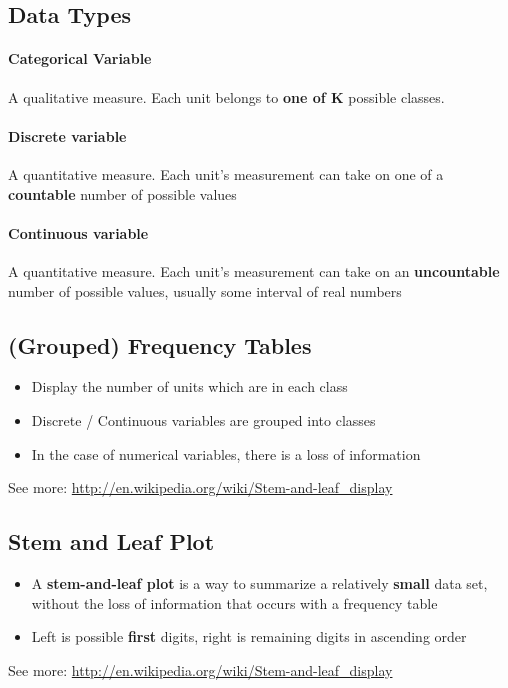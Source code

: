     \subsection{Data Types}
      \paragraph{Categorical Variable} A qualitative measure. Each unit belongs
      to \textbf{one of K} possible classes.

      \paragraph{Discrete variable} A quantitative measure. Each unit's
      measurement can take on one of a \textbf{countable} number of possible
      values

      \paragraph{Continuous variable} A quantitative measure. Each unit's
      measurement can take on an \textbf{uncountable} number of possible values,
      usually some interval of real numbers

    \subsection{(Grouped) Frequency Tables}
      \begin{itemize}
        \item Display the number of units which are in each class
        \item Discrete / Continuous variables are grouped into classes
        \item In the case of numerical variables, there is a loss of
          information
      \end{itemize}
      See more: \url{http://en.wikipedia.org/wiki/Stem-and-leaf_display}

    \subsection{Stem and Leaf Plot}
      \begin{itemize}
        \item A \textbf{stem-and-leaf plot} is a way to summarize a relatively
          \textbf{small} data set, without the loss of information that occurs
          with a frequency table
        \item Left is possible \textbf{first} digits, right is remaining digits
          in ascending order
      \end{itemize}
      See more: \url{http://en.wikipedia.org/wiki/Stem-and-leaf_display}

